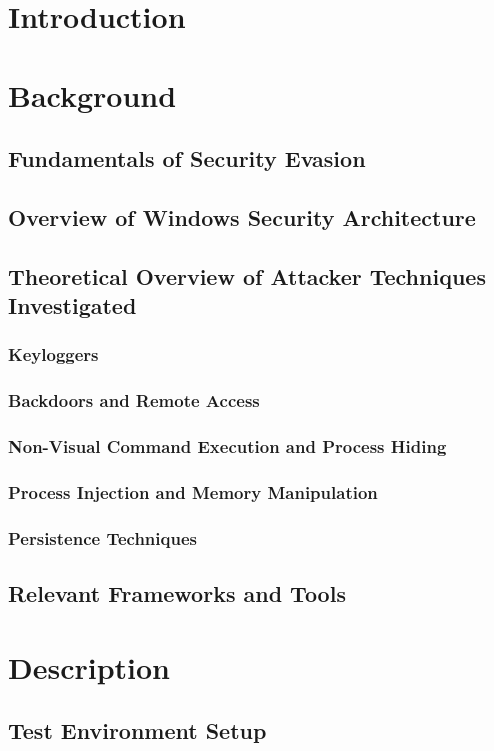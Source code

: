\documentclass[11pt]{article}
\begin{document}
		\newpage
		\section{Introduction}
		\section{Background}
			\subsection{Fundamentals of Security Evasion}
			\subsection{Overview of Windows Security Architecture}
			\subsection{Theoretical Overview of Attacker Techniques Investigated}
				\subsubsection{Keyloggers}
				\subsubsection{Backdoors and Remote Access}
				\subsubsection{Non-Visual Command Execution and Process Hiding}
				\subsubsection{Process Injection and Memory Manipulation}
				\subsubsection{Persistence Techniques}
			\subsection{Relevant Frameworks and Tools}
			
		\section{Description}
			\subsection{Test Environment Setup}
\end{document}
